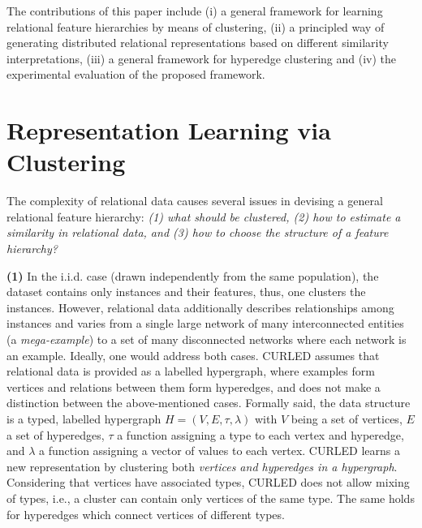 The contributions of this paper include (i)  a general framework for learning relational feature hierarchies by means of clustering, (ii) a principled way of generating distributed relational representations based on different similarity interpretations, (iii) a general framework for hyperedge clustering and (iv) the experimental evaluation of the proposed framework.


\section{Representation Learning via Clustering}
\label{sec:RL}

The complexity of relational data causes several issues in devising a general relational feature hierarchy: \textit{(1) what should be clustered, (2) how to estimate a similarity in relational data, and (3) how to choose the structure of a feature hierarchy? }


\textbf{(1)} 
In the i.i.d. case (drawn independently from the same population), the dataset contains only instances and their features, thus, one clusters the instances.
However, relational data additionally describes relationships among instances and  varies from a single large network of many interconnected entities (a \textit{mega-example}) to a set of many disconnected networks where each network is an example.
Ideally, one would address both cases.
CURLED assumes that relational data is provided as a labelled hypergraph, where examples form vertices and relations between them form hyperedges, and does not make a distinction between the above-mentioned cases.
Formally said, the data structure is a typed, labelled hypergraph $H = (V,E, \tau, \lambda)$ with $V$ being a set of vertices, $E$ a set of hyperedges, $\tau$  a function  assigning a type to each vertex and hyperedge, and $\lambda$ a function assigning a vector of values to each vertex. 
CURLED learns a new representation by clustering both \textit{vertices and hyperedges in a hypergraph}.
Considering that vertices have associated types, CURLED does not allow mixing of types, i.e., a cluster can contain only vertices of the same type.
The same holds for hyperedges which connect vertices of different types. 



